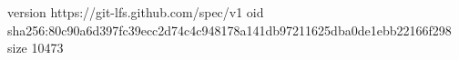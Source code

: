 version https://git-lfs.github.com/spec/v1
oid sha256:80c90a6d397fc39ecc2d74c4c948178a141db97211625dba0de1ebb22166f298
size 10473

